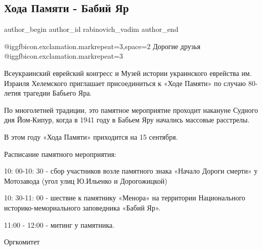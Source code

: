  
 
 
 
 
 
\subsection{Хода Памяти - Бабий Яр}
\label{sec:14_09_2021.fb.rabinovich_vadim.1.hoda_pamjati_babij_jar}
 
\ifcmt
 author_begin
   author_id rabinovich_vadim
 author_end
\fi

@igg{fbicon.exclamation.mark}{repeat=3,space=2} Дорогие друзья @igg{fbicon.exclamation.mark}{repeat=3}

Всеукраинский еврейский конгресс и Музей истории украинского еврейства им.
Израиля Хелемского приглашает присоединиться к «Ходе Памяти» по случаю 80-летия
трагедии Бабьего Яра.

По многолетней традиции, это памятное мероприятие проходит
накануне Судного дня Йом-Кипур, когда в 1941 году в Бабьем Яру начались
массовые расстрелы.

В этом году «Хода Памяти» приходится на 15 сентября.

Расписание памятного мероприятия:

10: 00-10: 30 - сбор участников возле памятного знака «Начало Дороги смерти» у
Мотозавода  (угол улиц Ю.Ильенко и Дорогожицкой)

10: 30-11: 00 - шествие к памятнику «Менора» на территории Национального
историко-мемориального заповедника «Бабий Яр».

11:00  - 12:00 - митинг у памятника.

Оргкомитет
